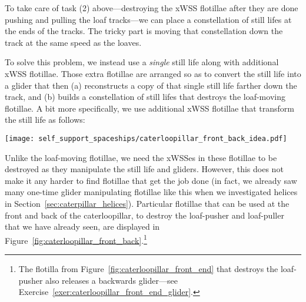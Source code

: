 To take care of task (2) above---destroying the xWSS flotillae after they are done pushing and pulling the loaf tracks---we can place a constellation of still lifes at the ends of the tracks. The tricky part is moving that constellation down the track at the same speed as the loaves.

To solve this problem, we instead use a \emph{single} still life along with additional xWSS flotillae. Those extra flotillae are arranged so as to convert the still life into a glider that then (a) reconstructs a copy of that single still life farther down the track, and (b) builds a constellation of still lifes that destroys the loaf-moving flotillae. A bit more specifically, we use additional xWSS flotillae that transform the still life as follows:

\noindent\begin{center}
	\centering
	\texttt{[image: self\_support\_spaceships/caterloopillar\_front\_back\_idea.pdf]}
\end{center}

Unlike the loaf-moving flotillae, we need the xWSSes in these flotillae to be destroyed as they manipulate the still life and gliders. However, this does not make it any harder to find flotillae that get the job done (in fact, we already saw many one-time glider manipulating flotillae like this when we investigated helices in Section~\ref{sec:caterpillar_helices}). Particular flotillae that can be used at the front and back of the caterloopillar, to destroy the loaf-pusher and loaf-puller that we have already seen, are displayed in Figure~\ref{fig:caterloopillar_front_back}.\footnote{The flotilla from Figure~\ref{fig:caterloopillar_front_end} that destroys the loaf-pusher also releases a backwards glider---see Exercise~\ref{exer:caterloopillar_front_end_glider}.}

